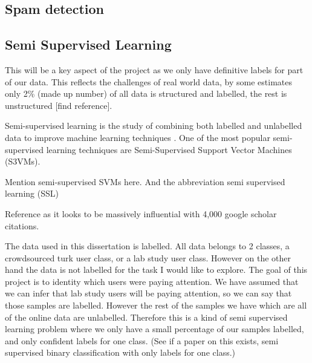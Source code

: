 \documentclass{article}
\begin{document}
\subsection{Spam detection}



\subsection{Semi Supervised Learning}
This will be a key aspect of the project as we only have definitive labels for part of our data.
This reflects the challenges of real world data, by some estimates only 2\% (made up number) of all data is structured and labelled, the rest is unstructured [find reference].

Semi-supervised learning is the study of combining both labelled and unlabelled data to improve machine learning techniques \cite{zhu2009introduction}.
One of the most popular semi-supervised learning techniques are Semi-Supervised Support Vector Machines (S3VMs).


Mention semi-supervised SVMs here. 
And the abbreviation semi supervised learning (SSL)


Reference \cite{zhu2005semi} as it looks to be massively influential with 4,000 google scholar citations.




The data used in this dissertation is labelled.
All data belongs to 2 classes, a crowdsourced turk user class, or a lab study user class.
However on the other hand the data is not labelled for the task I would like to explore.
The goal of this project is to identity which users were paying attention.
We have assumed that we can infer that lab study users will be paying attention, so we can say that those samples are labelled.
However the rest of the samples we have which are all of the online data are unlabelled.
Therefore this is a kind of semi supervised learning problem where we only have a small percentage of our samples labelled, and only confident labels for one class.
(See if a paper on this exists, semi supervised binary classification with only labels for one class.)
\end{document}
